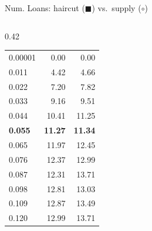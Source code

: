 \documentclass[aspectratio=169,10pt]{beamer}
\begin{document}
\begin{frame}{Num. Loans: haircut ($\blacksquare$) vs.\ supply ($\circ$)}
\begin{columns}[T]
\begin{column}{0.42\textwidth}
\begin{tabular}{lrr}
        \midrule
        0.00001 & 0.00 & 0.00 \\
        0.011 & 4.42 & 4.66 \\
        0.022 & 7.20 & 7.82 \\
        0.033 & 9.16 & 9.51 \\
        0.044 & 10.41 & 11.25 \\
        \textbf{0.055} & \textbf{11.27} & \textbf{11.34} \\
        0.065 & 11.97 & 12.45 \\
        0.076 & 12.37 & 12.99 \\
        0.087 & 12.31 & 13.71 \\
        0.098 & 12.81 & 13.03 \\
        0.109 & 12.87 & 13.49 \\
        0.120 & 12.99 & 13.71 \\
        \bottomrule
      \end{tabular}
    \end{column}
  \end{columns}
\end{frame}
\end{document}
